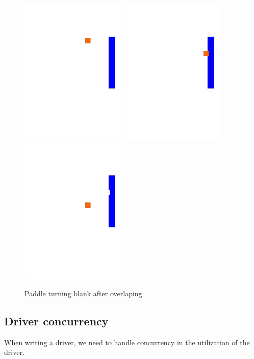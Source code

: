 \begin{figure}[h]
	\label{fig:pong_overlapping}
	\includegraphics[width=5cm, trim= 0 240 0 100]{img/pong_overlapping_0.pdf}
	\includegraphics[width=5cm, trim= 0 240 0 100]{img/pong_overlapping_1.pdf}
	\includegraphics[width=5cm, trim= 0 240 0 100]{img/pong_overlapping_2.pdf}
	
	\caption{Paddle turning blank after overlaping}
\end{figure}
\newpage
\subsection{Driver concurrency}
When writing a driver, we need to handle concurrency in the utilization of the driver.
